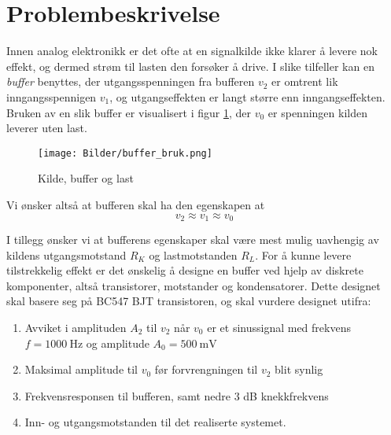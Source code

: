 \section{Problembeskrivelse}
\label{problemBeskrivelse}

Innen analog elektronikk er det ofte at en signalkilde ikke klarer å levere nok effekt, og dermed strøm til 
lasten den forsøker å drive. I slike tilfeller kan en \textit{buffer} benyttes, der utgangsspenningen fra 
bufferen $v_2$ er omtrent lik inngangsspennigen $v_1$, og utgangseffekten er langt større enn inngangseffekten.
Bruken av en slik buffer er visualisert i figur \ref{fig:buffer_bruk}, der $v_0$ er spenningen kilden 
leverer uten last.

\begin{figure}[H]
    \centering 
    \texttt{[image: Bilder/buffer\_bruk.png]}
    \caption{Kilde, buffer og last \cite{problem_stilling}}
    \label{fig:buffer_bruk}
\end{figure}

Vi ønsker altså at bufferen skal ha den egenskapen at
\[
    v_2 \approx v_1 \approx v_0
\]

I tillegg ønsker vi at bufferens egenskaper skal være mest mulig uavhengig av kildens utgangsmotstand 
$R_K$ og lastmotstanden $R_L$. For å kunne levere tilstrekkelig effekt er det ønskelig å designe 
en buffer ved hjelp av diskrete komponenter, altså transistorer, motstander og kondensatorer. 
Dette designet skal basere seg på BC547 BJT transistoren, og skal vurdere designet utifra:
\begin{enumerate}
    \item Avviket i amplituden $A_2$ til $v_2$ når $v_0$ er et sinussignal med frekvens $f = \SI{1000}{\hertz}$ og 
        amplitude $A_0 = \SI{500}{\milli\volt}$
    \item Maksimal amplitude til $v_0$ før forvrengningen til $v_2$ blit synlig
    \item Frekvensresponsen til bufferen, samt nedre $3$ dB knekkfrekvens
    \item Inn- og utgangsmotstanden til det realiserte systemet.
\end{enumerate}
\newpage
